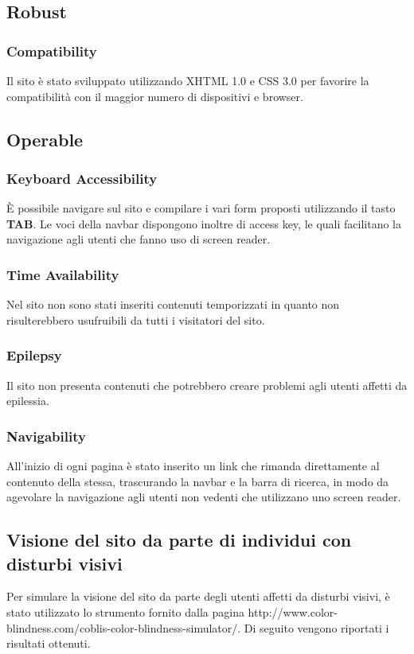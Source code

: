 \documentclass[10pt, a4paper]{article}
\begin{document}
\subsection{Robust}

\subsubsection{Compatibility}
Il sito è stato sviluppato utilizzando XHTML 1.0 e CSS 3.0 per favorire la compatibilità con il maggior numero di dispositivi e browser.

\subsection{Operable}

\subsubsection{Keyboard Accessibility}
È possibile navigare sul sito e compilare i vari form proposti utilizzando il tasto \textbf{TAB}. Le voci della navbar dispongono inoltre di access key, le quali facilitano la navigazione agli utenti che fanno uso di screen reader.

\subsubsection{Time Availability}
Nel sito non sono stati inseriti contenuti temporizzati in quanto non risulterebbero usufruibili da tutti i visitatori del sito.

\subsubsection{Epilepsy}
Il sito non presenta contenuti che potrebbero creare problemi agli utenti affetti da epilessia.

\subsubsection{Navigability}
All'inizio di ogni pagina è stato inserito un link che rimanda direttamente al contenuto della stessa, trascurando la navbar e la barra di ricerca, in modo da agevolare la navigazione agli utenti non vedenti che utilizzano uno screen reader.

\subsection{Visione del sito da parte di individui con disturbi visivi}
Per simulare la visione del sito da parte degli utenti affetti da disturbi visivi, è stato utilizzato lo strumento fornito dalla pagina http://www.color-blindness.com/coblis-color-blindness-simulator/. Di seguito vengono riportati i risultati ottenuti.
\end{document}
